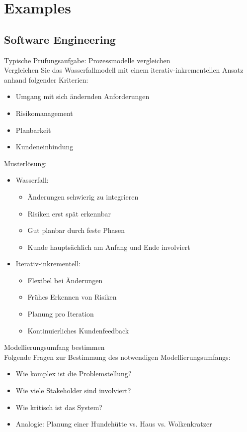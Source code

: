 \section{Examples}

\subsection{Software Engineering}

\begin{example2}[breakable]{Typische Prüfungsaufgabe: Prozessmodelle vergleichen}\\
Vergleichen Sie das Wasserfallmodell mit einem iterativ-inkrementellen Ansatz anhand folgender Kriterien:
\begin{itemize}
    \item Umgang mit sich ändernden Anforderungen
    \item Risikomanagement
    \item Planbarkeit
    \item Kundeneinbindung
\end{itemize}

Musterlösung:
\begin{itemize}
    \item Wasserfall:
    \begin{itemize}
        \item Änderungen schwierig zu integrieren
        \item Risiken erst spät erkennbar
        \item Gut planbar durch feste Phasen
        \item Kunde hauptsächlich am Anfang und Ende involviert
    \end{itemize}
    \item Iterativ-inkrementell:
    \begin{itemize}
        \item Flexibel bei Änderungen
        \item Frühes Erkennen von Risiken
        \item Planung pro Iteration
        \item Kontinuierliches Kundenfeedback
    \end{itemize}
\end{itemize}
\end{example2}

\begin{KR}{Modellierungsumfang bestimmen}\\
Folgende Fragen zur Bestimmung des notwendigen Modellierungsumfangs:
\begin{itemize}
    \item Wie komplex ist die Problemstellung?
    \item Wie viele Stakeholder sind involviert?
    \item Wie kritisch ist das System?
    \item Analogie: Planung einer Hundehütte vs. Haus vs. Wolkenkratzer
\end{itemize}
\end{KR}

